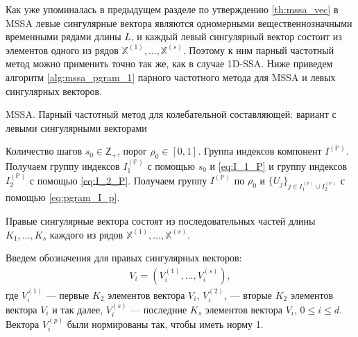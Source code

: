 \documentclass[specialist,
               substylefile = spbu.rtx,
               subf,href,colorlinks=true, 12pt]{disser}
\begin{document}
{{Как уже упоминалась в предыдущем разделе по утверждению \ref{th:mssa_vec} в MSSA левые сингулярные вектора являются одномерными вещественнозначными временными рядами длины $L$, и каждый левый сингулярный вектор состоит из элементов одного из 
рядов $\mathbb{X}^{(1)}, \ldots, \mathbb{X}^{(s)}$. Поэтому к ним парный частотный метод можно применить точно так же, как в случае 1D-SSA. Ниже приведем алгоритм \ref{alg:mssa_pgram_1} парного частотного метода для MSSA и левых сингулярных векторов.

\begin{algorithm}[!hhh]
\caption{MSSA. Парный частотный метод для колебательной составляющей: вариант с левыми сингулярными векторами}
\label{alg:mssa_pgram_1}
\begin{algorithmic}[1]
\REQUIRE Количество шагов $s_0 \in \mathsf{Z}_{+}$, порог $\rho_0 \in [0,1]$.
\ENSURE Группа индексов компонент $I^{(\mathbb{P})}$.
\STATE  Получаем группу индексов $I_1^{(\mathbb{P})}$ с помощью $s_0$ и \eqref{eq:I_1_P} и группу индексов $I_2^{(\mathbb{P})}$ с помощью \eqref{eq:I_2_P}. 
\STATE Получаем группу $I^{(\mathbb{P})}$ по $\rho_0$ и $\{U_j\}_{j \in I_1^{(\mathbb{P})} \cup I_2^{(\mathbb{P})}}$ с помощью  \eqref{eq:pgram_I_p}.
\end{algorithmic}
\end{algorithm}

Правые сингулярные вектора 
состоят из последовательных частей длины $K_1,\ldots,K_s$ каждого из рядов $\mathbb{X}^{(1)}, \ldots, \mathbb{X}^{(s)}$. 


Введем обозначения для правых сингулярных векторов:  
\begin{gather*}
{V}_{i} = \left({V}_i^{(1)}, \ldots, {V}_i^{(s)}\right), 
\end{gather*}
где $V_i^{(1)}$ --- первые $K_2$ элементов вектора ${V}_{i}$,  $V_i^{(2)}$, --- вторые $K_2$ элементов вектора ${V}_{i}$ и так далее, $V_i^{(s)}$ --- последние $K_s$ элементов вектора ${V}_{i}$, $0 \leqslant i \leqslant d$. 
Вектора $V_i^{(p)}$ были нормированы так, чтобы иметь норму 1.

}}
\end{document}
